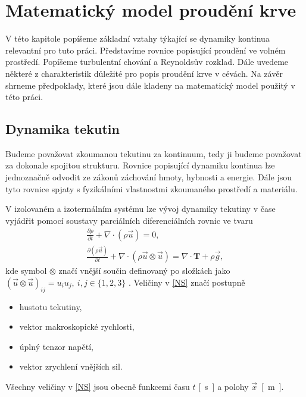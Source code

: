 \chapter{Matematický model proudění krve}\label{mmodel}
V této kapitole popíšeme základní vztahy týkající se dynamiky kontinua relevantní pro tuto práci. Představíme rovnice popisující proudění ve volném prostředí. Popíšeme turbulentní chování a Reynoldsův rozklad. Dále uvedeme některé z charakteristik důležité pro popis proudění krve v cévách. Na závěr shrneme předpoklady, které jsou dále kladeny na matematický model použitý v této práci.

\section{Dynamika tekutin}
Budeme považovat zkoumanou tekutinu za kontinuum, tedy ji budeme považovat za dokonale spojitou strukturu. Rovnice popisující dynamiku kontinua lze jednoznačně odvodit ze zákonů záchování hmoty, hybnosti a energie. Dále jsou tyto rovnice spjaty s fyzikálními vlastnostmi zkoumaného prostředí a materiálu. 

V izolovaném a izotermálním systému lze vývoj dynamiky tekutiny v čase vyjádřit pomocí soustavy parciálních diferenciálních rovnic ve tvaru
\\
\begin{subequations}\label{NS}
	\begin{gather}
	\label{a}
	\frac{\partial \rho}{\partial t} + \nabla \cdot (\rho \vec{u}) = 0, \\[5pt]
	\label{b}
	\frac{\partial (\rho \vec{u})}{\partial t} + \nabla \cdot (\rho \vec{u} \otimes \vec{u}) = \nabla \cdot \mathbf{T} + \rho \vec{g},
	\end{gather}
\end{subequations}
kde symbol $ \otimes $ značí vnější součin definovaný po složkách jako $ (\vec{u} \otimes \vec{u})_{ij} = u_{i} u_{j}, \: i,j \in \{1,2,3\} $ \cite{Anderson}. Veličiny v \eqref{NS} značí postupně
\begin{itemize}
	\item[]{\makebox[3cm]{$ \rho $ \si{[kg.m^{-3}]}\hfill} hustotu tekutiny,}
	\item[]{ vektor makroskopické rychlosti,}
	\item[]{ úplný tenzor napětí,}
	\item[]{ vektor zrychlení vnějších sil.}
\end{itemize}
Všechny veličiny v \eqref{NS} jsou obecně funkcemi času $ t $ \si{[s]} a polohy $ \vec{x} $~\si{[m]}.

